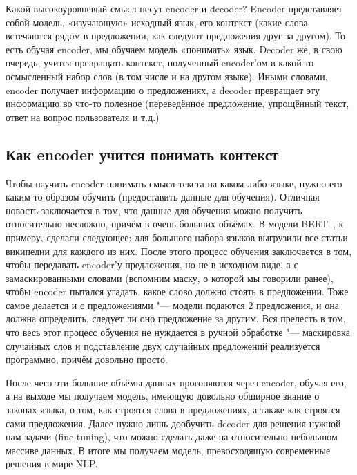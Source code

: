 Какой высокоуровневый смысл несут encoder и decoder? Encoder представляет собой модель, «изучающую» исходный язык, его контекст (какие слова встечаются рядом в предложении, как следуют предложения друг за другом). То есть обучая encoder, мы обучаем модель «понимать» язык. Decoder же, в свою очередь, учится превращать контекст, полученный encoder'ом в какой-то осмысленный набор слов (в том числе и на другом языке). Иными словами, encoder получает информацию о предложениях, а decoder превращает эту информацию во что-то полезное (переведённое предложение, упрощённый текст, ответ на вопрос пользователя и т.д.)


\subsection{Как encoder учится понимать контекст}


Чтобы научить encoder понимать смысл текста на каком-либо языке, нужно его каким-то образом обучить (предоставить данные для обучения).
Отличная новость заключается в том, что данные для обучения можно получить относительно несложно, причём в очень больших объёмах.
В модели BERT~\cite{BERTmodel}, к примеру, сделали следующее: для большого набора языков выгрузили все статьи википедии для каждого из них.
После этого процесс обучения заключается в том, чтобы передавать encoder'у предложения, но не в исходном виде, а с замаскированными словами (вспомним маску, о которой мы говорили ранее), чтобы encoder пытался угадать, какое слово должно стоять в предложении.
Тоже самое делается и с предложениями "--- модели подаются 2 предложения, и она должна определить, следует ли оно предложение за другим.
Вся прелесть в том, что весь этот процесс обучения не нуждается в ручной обработке "--- маскировка случайных слов и подставление двух случайных предложений реализуется программно, причём довольно просто.

После чего эти большие объёмы данных прогоняются через encoder, обучая его, а на выходе мы получаем модель, имеющую довольно обширное знание о законах языка, о том, как строятся слова в предложениях, а также как строятся сами предложения. Далее нужно лишь дообучить decoder для решения нужной нам задачи (fine-tuning), что можно сделать даже на относительно небольшом массиве данных. В итоге мы получаем модель, превосходящую современные решения в мире NLP.
